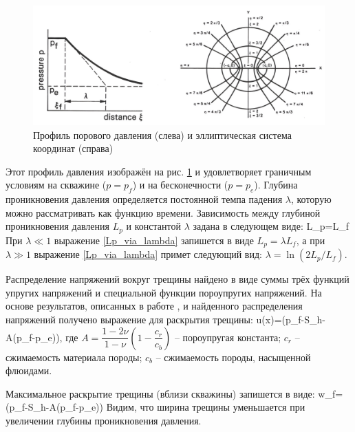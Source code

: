 \begin{figure}[H] 
\center
\includegraphics[width=\linewidth]{images/Hagoort_pressure_distribution.jpg}
\caption{Профиль порового давления (слева) и эллиптическая система координат (справа) \cite{hagoort_phd}} 
\label{fig:hagoort_pressure_distribution}  
\end{figure}

Этот профиль давления изображён на рис. \ref{fig:hagoort_pressure_distribution} и удовлетворяет граничным условиям на скважине ($p=p_f$) и на бесконечности ($p=p_e$).
Глубина проникновения давления определяется постоянной темпа падения $\lambda$, которую можно рассматривать как функцию времени.
Зависимость между глубиной проникновения давления $L_p$ и константой $\lambda$ задана в следующем виде:
\beq\label{Lp_via_lambda}
L_p=L_{\!f}\sinh{\lambda}
\eeq
При $\lambda\ll 1$ выражение \eqref{Lp_via_lambda} запишется в виде $L_p=\lambda L_f$, а при $\lambda\gg 1$ выражение \eqref{Lp_via_lambda} примет следующий вид: $\lambda=\ln{\left(2L_p/L_{\!f}\right)}$.

Распределение напряжений вокруг трещины найдено в виде суммы трёх функций упругих напряжений и специальной функции пороупругих напряжений.
На основе результатов, описанных в работе \cite{timoshenko_goodier}, и найденного распределения напряжений получено выражение для раскрытия трещины:
\beq\label{HaggoortFractureOpening}
u(x)=\left(p_{\!f}-S_h-A\left(p_{\!f}-p_e\right)\right),
\eeq
где
$A=\dfrac{1-2\nu}{1-\nu}\left(1-\dfrac{c_r}{c_b}\right)$ -- пороупругая константа;
$c_r$ -- сжимаемость материала породы;
$c_b$ -- сжимаемость породы, насыщенной флюидами.

Максимальное раскрытие трещины (вблизи скважины) запишется в виде:
\beq
w_{\!f}=\left(p_{\!f}-S_h-A\left(p_{\!f}-p_e\right)\right)
\eeq
Видим, что ширина трещины уменьшается при увеличении глубины проникновения давления.

